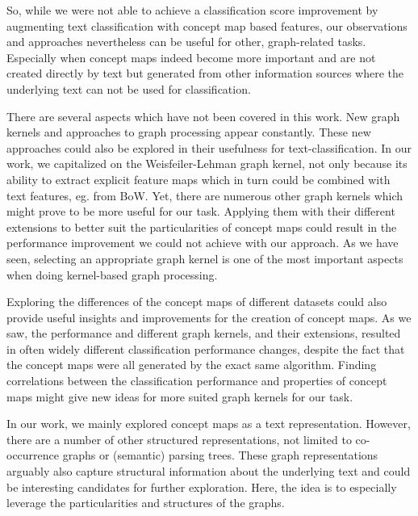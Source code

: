 So, while we were not able to achieve a classification score improvement by augmenting text classification with concept map based features, our observations and approaches nevertheless can be useful for other, graph-related tasks.
Especially when concept maps indeed become more important and are not created directly by text but generated from other information sources where the underlying text can not be used for classification.

There are several aspects which have not been covered in this work.
New graph kernels and approaches to graph processing appear constantly. These new approaches could also be explored in their usefulness for text-classification.
In our work, we capitalized on the Weisfeiler-Lehman graph kernel, not only because its ability to extract explicit feature maps which in turn could be combined with text features, eg. from BoW.
Yet, there are numerous other graph kernels which might prove to be more useful for our task.
Applying them with their different extensions to better suit the particularities of concept maps could result in the performance improvement we could not achieve with our approach.
As we have seen, selecting an appropriate graph kernel is one of the most important aspects when doing kernel-based graph processing.

Exploring the differences of the concept maps of different datasets could also provide useful insights and improvements for the creation of concept maps.
As we saw, the performance and different graph kernels, and their extensions, resulted in often widely different classification performance changes, despite the fact that the concept maps were all generated by the exact same algorithm.
Finding correlations between the classification performance and properties of concept maps might give new ideas for more suited graph kernels for our task.

In our work, we mainly explored concept maps as a text representation. However, there are a number of other structured representations, not limited to co-occurrence graphs or (semantic) parsing trees.
These graph representations arguably also capture structural information about the underlying text and could be interesting candidates for further exploration.
Here, the idea is to especially leverage the particularities and structures of the graphs.


